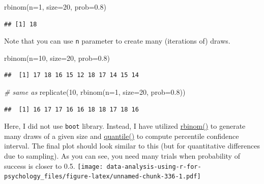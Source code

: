 \documentclass[
]{book}
\newenvironment{Shaded}{\begin{snugshade}}{\end{snugshade}}
\newcommand{\AttributeTok}[1]{\textcolor[rgb]{0.77,0.63,0.00}{#1}}
\newcommand{\CommentTok}[1]{\textcolor[rgb]{0.56,0.35,0.01}{\textit{#1}}}
\newcommand{\DecValTok}[1]{\textcolor[rgb]{0.00,0.00,0.81}{#1}}
\newcommand{\FloatTok}[1]{\textcolor[rgb]{0.00,0.00,0.81}{#1}}
\newcommand{\FunctionTok}[1]{\textcolor[rgb]{0.00,0.00,0.00}{#1}}
\newcommand{\NormalTok}[1]{#1}
\begin{document}
\begin{Shaded}
\begin{Highlighting}[]
\FunctionTok{rbinom}\NormalTok{(}\AttributeTok{n=}\DecValTok{1}\NormalTok{, }\AttributeTok{size=}\DecValTok{20}\NormalTok{, }\AttributeTok{prob=}\FloatTok{0.8}\NormalTok{)}
\end{Highlighting}
\end{Shaded}

\begin{verbatim}
## [1] 18
\end{verbatim}

Note that you can use \texttt{n} parameter to create many (iterations of) draws.

\begin{Shaded}
\begin{Highlighting}[]
\FunctionTok{rbinom}\NormalTok{(}\AttributeTok{n=}\DecValTok{10}\NormalTok{, }\AttributeTok{size=}\DecValTok{20}\NormalTok{, }\AttributeTok{prob=}\FloatTok{0.8}\NormalTok{)}
\end{Highlighting}
\end{Shaded}

\begin{verbatim}
##  [1] 17 18 16 15 12 18 17 14 15 14
\end{verbatim}

\begin{Shaded}
\begin{Highlighting}[]
\CommentTok{\# same as}
\FunctionTok{replicate}\NormalTok{(}\DecValTok{10}\NormalTok{, }\FunctionTok{rbinom}\NormalTok{(}\AttributeTok{n=}\DecValTok{1}\NormalTok{, }\AttributeTok{size=}\DecValTok{20}\NormalTok{, }\AttributeTok{prob=}\FloatTok{0.8}\NormalTok{))}
\end{Highlighting}
\end{Shaded}

\begin{verbatim}
##  [1] 16 17 17 16 16 18 18 17 18 16
\end{verbatim}

Here, I did not use \texttt{boot} library. Instead, I have utilized \href{https://stat.ethz.ch/R-manual/R-devel/library/stats/html/Binomial.html}{rbinom()} to generate many draws of a given size and \href{https://stat.ethz.ch/R-manual/R-devel/library/stats/html/quantile}{quantile()} to compute percentile confidence interval. The final plot should look similar to this (but for quantitative differences due to sampling). As you can see, you need many trials when probability of success is closer to 0.5.
\texttt{[image: data-analysis-using-r-for-psychology\_files/figure-latex/unnamed-chunk-336-1.pdf]}
\end{document}
